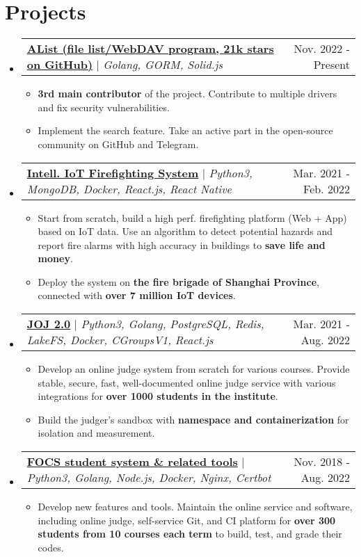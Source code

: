 \documentclass[letterpaper,11pt]{article}
\makeatletter
\newcommand{\resumeItem}[1]{
  \item\small{
    {#1 \vspace{-2pt}}
  }
}
\newcommand{\resumeProjectHeader}[2]{
    \item
    \begin{tabular*}{0.98\textwidth}{l@{\extracolsep{\fill}}r}
      \small#1 & #2 \\
    \end{tabular*}\vspace{-7pt}
}
\newcommand{\resumeSubHeaderListStart}{\begin{itemize}[leftmargin=0.15in, label={}]}
\newcommand{\resumeSubHeaderListEnd}{\end{itemize}}
\newcommand{\resumeItemListStart}{\begin{itemize}}
\newcommand{\resumeItemListEnd}{\end{itemize}\vspace{-5pt}}
\makeatother
\begin{document}
\section{Projects}
    \resumeSubHeaderListStart
      \resumeProjectHeader
        {\href{https://github.com/alist-org/alist}{\textbf{AList (file list/WebDAV program, 21k stars on GitHub)}} $|$ \emph{Golang, GORM, Solid.js}}{Nov. 2022 - Present}
        \resumeItemListStart
          \resumeItem{\textbf{3rd main contributor} of the project. Contribute to multiple drivers and fix security vulnerabilities.}
          \resumeItem{Implement the search feature. Take an active part in the open-source community on GitHub and Telegram.}
        \resumeItemListEnd
      \resumeProjectHeader
        {\href{https://github.com/SJTU-IPP-Firefighting}{\textbf{Intell. IoT Firefighting System}} $|$ \emph{Python3, MongoDB, Docker, React.js, React Native}}{Mar. 2021 - Feb. 2022}
        \resumeItemListStart
          \resumeItem{Start from scratch, build a high perf. firefighting platform (Web + App) based on IoT data. Use an algorithm to detect potential hazards and report fire alarms with high accuracy in buildings to \textbf{save life and money}.}
          \resumeItem{Deploy the system on \textbf{the fire brigade of Shanghai Province}, connected with \textbf{over 7 million IoT devices}.}
        \resumeItemListEnd
      \resumeProjectHeader
        {\href{https://github.com/joint-online-judge}{\textbf{JOJ 2.0}} $|$ \emph{Python3, Golang, PostgreSQL, Redis, LakeFS, Docker, CGroupsV1, React.js}}{Mar. 2021 - Aug. 2022}
        \resumeItemListStart
          \resumeItem{Develop an online judge system from scratch for various courses. Provide stable, secure, fast, well-documented online judge service with various integrations for \textbf{over 1000 students in the institute}.}
          \resumeItem{Build the judger's sandbox with \textbf{namespace and containerization} for isolation and measurement.}
        \resumeItemListEnd
      \resumeProjectHeader
        {\href{https://gist.github.com/BoYanZh/fc4469c20fd6adf42c212114532aaac0}{\textbf{FOCS student system \& related tools}} $|$ \emph{Python3, Golang, Node.js, Docker, Nginx, Certbot}}{Nov. 2018 - Aug. 2022}
        \resumeItemListStart
          \resumeItem{Develop new features and tools. Maintain the online service and software, including online judge, self-service Git, and CI platform for \textbf{over 300 students from 10 courses each term} to build, test, and grade their codes.}
        \resumeItemListEnd
    \resumeSubHeaderListEnd



\end{document}
